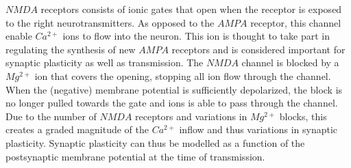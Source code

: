 	$NMDA$ receptors consists of ionic gates that open when the receptor is exposed to the right neurotransmitters\cite{CITE}.
	As opposed to the $AMPA$ receptor, this channel enable $Ca^{2+}$ ions to flow into the neuron.
	This ion is thought to take part in regulating the synthesis of new $AMPA$ receptors and is considered important for synaptic plasticity as well as transmission\cite{CITE}.
	The $NMDA$ channel is blocked by a $Mg^{2+}$ ion that covers the opening, stopping all ion flow through the channel\cite{CITE}.
	When the (negative) membrane potential is sufficiently depolarized, the block is no longer pulled towards the gate and ions is able to pass through the channel. %
	Due to the number of $NMDA$ receptors and variations in $Mg^{2+}$ blocks, this creates a graded magnitude of the $Ca^{2+}$ inflow and thus variations in synaptic plasticity\cite{CITE}.
	Synaptic plasticity can thus be modelled as a function of the postsynaptic membrane potential at the time of transmission\cite{CITE}.
